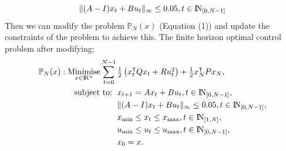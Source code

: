 \documentclass[a4paper,11pt,reqno]{amsart}
\newcommand{\R}{{\rm I\!R}}
\newcommand{\N}{{\rm I\!N}}
\newcommand{\tran}{\intercal}
\DeclareMathOperator*{\minimise}{Minimise}
\begin{document}


\begin{equation}
    \|(A-I)x_t+Bu_t\|_{\infty}\leq 0.05, t\in \N_{[0,N-1]}
\notag
\end{equation}
Then we can modify the problem $\mathbb{P}_N(x)$ (Equation (1)) and update the constraints of the problem to achieve this.
The finite horizon optimal control problem after modifying:
\begin{subequations}
    \begin{align}
        \mathbb{P}_N(x): \minimise_{x\in \R^n}\sum_{t=0}^{N-1}\,
        & \textstyle\frac{1}{2}\left(x_t^{\tran}Qx_t+Ru^2_t\right)+\frac{1}{2}x_N^{\tran}Px_N,
        \\
        \text{subject to: }\,
        & x_{t+1} = A x_t + B u_t, t\in\N_{[0, N-1]},
        \\
        & \|(A-I)x_t+Bu_t\|_{\infty}\leq 0.05, t\in \N_{[0,N-1]},
        \\
        & x_{\mathrm{min}}\leq x_t\leq x_{\mathrm{max}}, t \in \N_{[1, N]},
        \\
        & u_{\mathrm{min}}\leq u_t\leq u_{\mathrm{max}}, t \in \N_{[0, N-1]},
        \\
        & x_{0} = x.
    \end{align}
\end{subequations}
\end{document}
